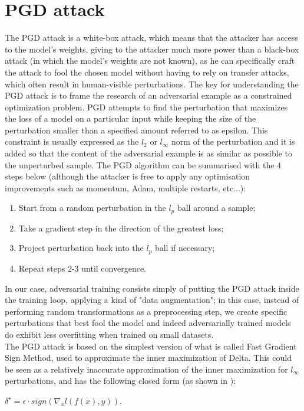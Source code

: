 \documentclass{article}
\begin{document}
\section{PGD attack}
The PGD attack is a white-box attack, which means that the attacker has access
to the model's weights, giving to the attacker much more power than a black-box
attack (in which the model's weights are not known), as he can specifically
craft the attack to fool the chosen model without having to rely on transfer
attacks, which often result in human-visible perturbations. The key for
understanding the PGD attack is to frame the research of an adversarial example as a
constrained optimization problem. PGD attempts to find the perturbation that
maximizes the loss of a model on a particular input while keeping the size of
the perturbation smaller than a specified amount referred to as epsilon. This
constraint is usually expressed as the $l_2$ or $l_{\infty}$ norm of the
perturbation and it is added so that the content of the adversarial example is as similar as possible to the unperturbed sample. The PGD algorithm can be summarised with the 4
steps below (although the attacker is free to apply any optimisation
improvements such as momentum, Adam, multiple restarts, etc...):
\begin{enumerate}
	\item Start from a random perturbation in the $l_p$ ball around a sample;
	\item Take a gradient step in the direction of the greatest loss;
	\item Project perturbation back into the $l_p$ ball if necessary;
	\item Repeat steps 2-3 until convergence.
\end{enumerate}
In our case, adversarial training consists simply of putting the PGD attack
inside the training loop, applying a kind of "data augmentation"; in this case,
instead of performing random transformations as a preprocessing step, we create
specific perturbations that best fool the model and indeed adversarially trained
models do exhibit less overfitting when trained on small datasets.\\
The PGD attack is based on the simplest version of what is called Fast Gradient
Sign Method, used to approximate the inner maximization of Delta. This could be
seen as a relatively inaccurate approximation of the inner maximization for
$l_{\infty}$ perturbations, and has the following closed form (as shown in
\cite{GoodfellowEtAl2014}):
\begin{center}
	$\delta^{\star} = \epsilon \cdot sign(\nabla_{x}l(f(x), y))$.
\end{center}
\end{document}
